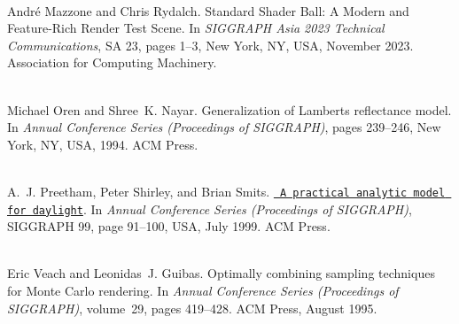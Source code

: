 \begin{DoxyDescription}
\item[\label{citelist_CITEREF_Mazzone:2023:Standard}%
\Hypertarget{citelist_CITEREF_Mazzone:2023:Standard}%
\mbox{[}7\mbox{]}]\hfill \\
Andr\'{e} Mazzone and Chris Rydalch. Standard Shader Ball\+: A Modern and Feature-\/\+Rich Render Test Scene. In {\itshape SIGGRAPH Asia 2023 Technical Communications}, SA \textquotesingle{}23, pages 1--3, New York, NY, USA, November 2023. Association for Computing Machinery. 


\item[\label{citelist_CITEREF_Oren:1994:Generalization}%
\Hypertarget{citelist_CITEREF_Oren:1994:Generalization}%
\mbox{[}8\mbox{]}]\hfill \\
Michael Oren and Shree~K. Nayar. Generalization of Lambert\textquotesingle{}s reflectance model. In {\itshape Annual Conference Series (Proceedings of SIGGRAPH)}, pages 239--246, New York, NY, USA, 1994. ACM Press. 


\item[\label{citelist_CITEREF_Preetham:1999:Practical}%
\Hypertarget{citelist_CITEREF_Preetham:1999:Practical}%
\mbox{[}9\mbox{]}]\hfill \\
A.~J. Preetham, Peter Shirley, and Brian Smits. \href{https://doi.org/10.1145/311535.311545}{\texttt{ A practical analytic model for daylight}}. In {\itshape Annual Conference Series (Proceedings of SIGGRAPH)}, SIGGRAPH \textquotesingle{}99, page 91–100, USA, July 1999. ACM Press. 


\item[\label{citelist_CITEREF_Veach:1995:Optimally}%
\Hypertarget{citelist_CITEREF_Veach:1995:Optimally}%
\mbox{[}10\mbox{]}]\hfill \\
Eric Veach and Leonidas~J. Guibas. Optimally combining sampling techniques for Monte Carlo rendering. In {\itshape Annual Conference Series (Proceedings of SIGGRAPH)}, volume~29, pages 419--428. ACM Press, August 1995. 


\end{DoxyDescription}